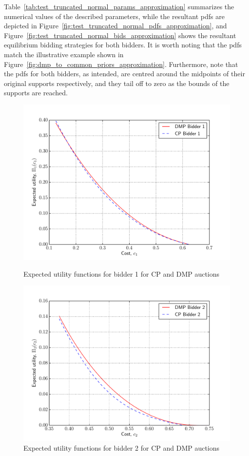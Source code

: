 Table~\ref{tab:test_truncated_normal_params_approximation} summarizes the numerical values of the described parameters, while the resultant pdfs are depicted in Figure~\ref{fig:test_truncated_normal_pdfs_approximation}, and Figure~\ref{fig:test_truncated_normal_bids_approximation} shows the resultant equilibrium bidding strategies for both bidders. It is worth noting that the pdfs match the illustrative example shown in Figure~\ref{fig:dmp_to_common_priors_approximation}. Furthermore, note that the pdfs for both bidders, as intended, are centred around the midpoints of their original supports respectively, and they tail off to zero as the bounds of the supports are reached.

\begin{figure}[p!]
  \includegraphics[width=\figsize]{Approximation/Figures/test_compare_bidder_1}
  \caption{Expected utility functions for bidder 1 for CP and DMP auctions}
  \label{fig:test_compare_bidder_1_approximation}
  \vspace{10mm}
  \includegraphics[width=\figsize]{Approximation/Figures/test_compare_bidder_2}
  \caption{Expected utility functions for bidder 2 for CP and DMP auctions}
  \label{fig:test_compare_bidder_2_approximation}
\end{figure}

